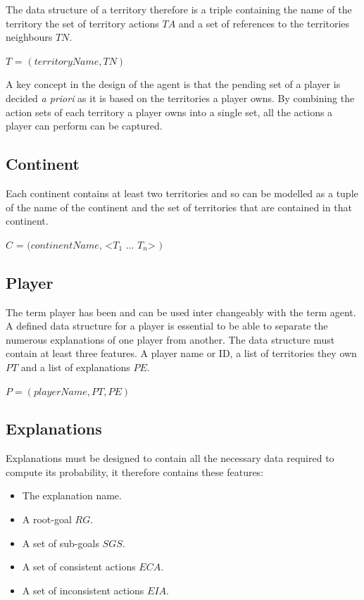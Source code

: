 \documentclass[parskip]{cs4rep}
\begin{document}
\newpage

The data structure of a territory therefore is a triple containing the name of the territory the set of territory actions $TA$ and a set of references to the territories neighbours $TN$.

\centerline{
$T$ = $( territoryName, TN )$
}

A key concept in the design of the agent is that the pending set of a player is decided \textit{a priori} as it is based on the territories a player owns. By combining the action sets of each territory a player owns into a single set, all the actions a player can perform can be captured.

\subsection{Continent}

Each continent contains at least two territories and so can be modelled as a tuple of the name of the continent and the set of territories that are contained in that continent.

\centerline{
$C$ = $( continentName$, <$T_{1}$ ... $T_{n}$> $)$
}

\subsection{Player}

The term player has been and can be used inter changeably with the term agent. A defined data structure for a player is essential to be able to separate the numerous explanations of one player from another. The data structure must contain at least three features. A player name or ID, a list of territories they own $PT$ and a list of explanations $PE$.\newline

\centerline{
$P = ( playerName, PT, PE )$
}

\subsection{Explanations}

Explanations must be designed to contain all the necessary data required to compute its probability, it therefore contains these features:

\begin{itemize}
\item
The explanation name.
\item
A root-goal $RG$.
\item
A set of sub-goals $SGS$.
\item
A set of consistent actions $ECA$.
\item
A set of inconsistent actions $EIA$.
\end{itemize}
\end{document}
